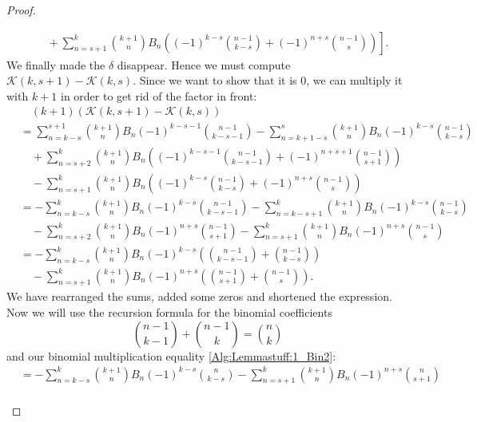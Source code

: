 \begin{proof}
\begin{subproof}
\begin{enumerate}[(i)]
\begin{align*}
				& \quad + \left.
				\sum\limits_{n=s+1}^k
				\binom{k+1}{n}B_n \left(
				(-1)^{k-s}\binom{n-1}{k-s} + (-1)^{n+s}\binom{n-1}{s}
				\right) \right].
			\end{align*}
			We finally made the $\delta$ disappear. Hence we must compute
			$\mathcal{K}(k,s+1) - \mathcal{K}(k,s)$. Since we want to show 
			that it is $0$, we can multiply it with $k + 1$ in order to get 
			rid of the factor in front:
			\begin{align*}
				& \quad
				(k+1) \left( \mathcal{K}(k,s+1) - \mathcal{K}(k,s) \right)\\
				& =
				\sum\limits_{n=k-s}^{s+1}
				\binom{k+1}{n} B_n (-1)^{k-s-1}
				\binom{n-1}{k-s-1} - \sum\limits_{n=k+1-s}^s
				\binom{k+1}{n} B_n (-1)^{k-s} \binom{n-1}{k-s} \\
				& \quad
				+ \sum\limits_{n=s+2}^k
				\binom{k+1}{n} B_n \left(
				(-1)^{k-s-1}\binom{n-1}{k-s-1}
				+ (-1)^{n+s+1}\binom{n-1}{s+1}
				\right) \\
				& \quad
				- \sum\limits_{n=s+1}^k
				\binom{k+1}{n} B_n \left(
				(-1)^{k-s}\binom{n-1}{k-s} + (-1)^{n+s}\binom{n-1}{s}
				\right) \\
				& =
				-\sum\limits_{n=k-s}^k
				\binom{k+1}{n} B_n (-1)^{k-s}
				\binom{n-1}{k-s-1} -\sum\limits_{n=k-s+1}^k
				\binom{k+1}{n}B_n (-1)^{k-s} \binom{n-1}{k-s} \\
				& \quad -
				\sum\limits_{n=s+2}^k
				\binom{k+1}{n}B_n (-1)^{n+s}
				\binom{n-1}{s+1} - \sum\limits_{n=s+1}^k
				\binom{k+1}{n}B_n (-1)^{n+s} \binom{n-1}{s} \\
				& =
				-\sum\limits_{n=k-s}^k
				\binom{k+1}{n}B_n (-1)^{k-s} \left(
				\binom{n-1}{k-s-1} + \binom{n-1}{k-s}
				\right) \\
				& \quad -
				\sum\limits_{n=s+1}^k
				\binom{k+1}{n} B_n (-1)^{n+s}
				\left( \binom{n-1}{s+1} + \binom{n-1}{s} \right).
			\end{align*}
			We have rearranged the sums, added some zeros and shortened the 
			expression. Now we will use the recursion formula for the binomial 
			coefficients
			\begin{equation*}
				\binom{n-1}{k-1} + \binom{n-1}{k}
				=
				\binom{n}{k}
			\end{equation*}
			and our binomial multiplication equality 
			\eqref{Alg:Lemmastuff:1_Bin2}:
			\begin{align*}
				& =
				- \sum\limits_{n=k-s}^k
				\binom{k+1}{n} B_n (-1)^{k-s} \binom{n}{k-s}
				- \sum\limits_{n=s+1}^k
				\binom{k+1}{n} B_n (-1)^{n+s} \binom{n}{s+1} \\

\end{align*}
\end{enumerate}
\end{subproof}
\end{proof}
